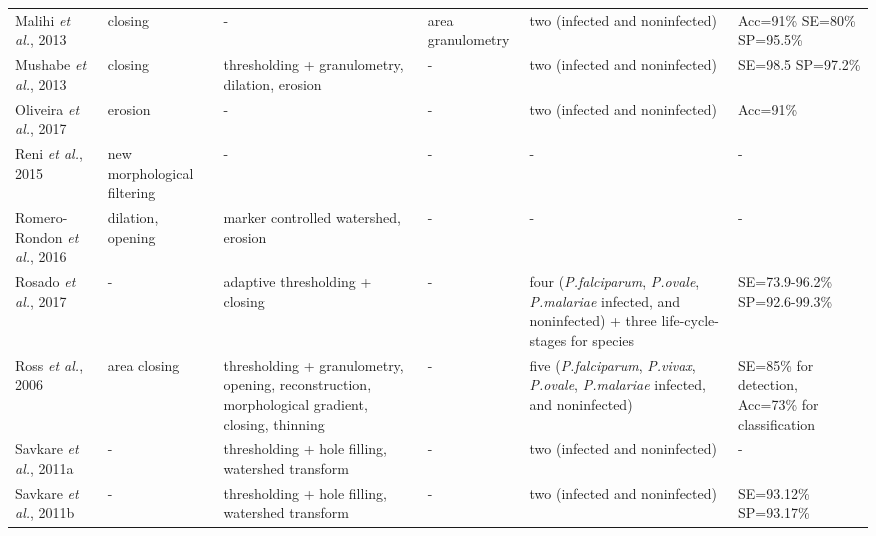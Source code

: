 \begin{longtable}{C{2.1cm} C{2.1cm} C{2.3cm} C{1.5cm} C{2.7cm} C{2.2cm} }
    Malihi \emph{et al.}, 2013  &
    	closing &
    	-  &
    	area granulometry &
    	two (infected and noninfected) &
    	Acc=91\% SE=80\% SP=95.5\% \vspace{0.6cm} \\	

    Mushabe \emph{et al.}, 2013  &
    	closing &
    	thresholding + granulometry, dilation, erosion  &
    	- &
    	two (infected and noninfected) &
    	SE=98.5 SP=97.2\% \vspace{0.6cm} \\	

    Oliveira \emph{et al.}, 2017  &
    	erosion &
    	-  &
    	- &
    	two (infected and noninfected) &
    	Acc=91\% \vspace{0.6cm} \\

    Reni \emph{et al.}, 2015  &
    	new morphological filtering &
    	-  &
    	- &
    	- &
    	- \vspace{0.6cm} \\

    Romero-Rondon \emph{et al.}, 2016  &
    	dilation, opening &
    	marker controlled watershed, erosion  &
    	- &
    	- &
    	- \vspace{0.6cm} \\

    Rosado \emph{et al.}, 2017  &
    	- &
    	adaptive thresholding + closing  &
    	- &
    	four (\emph{P.falciparum}, \emph{P.ovale}, \emph{P.malariae} infected, and noninfected) +
    three life-cycle-stages for species &
    	SE=73.9-96.2\% SP=92.6-99.3\% \vspace{0.6cm} \\

    Ross \emph{et al.}, 2006  &
    	area closing &
    	thresholding + granulometry, opening, reconstruction, morphological gradient, closing, thinning  &
        - &
    	five (\emph{P.falciparum}, \emph{P.vivax}, \emph{P.ovale}, \emph{P.malariae} infected, and noninfected) &
    	SE=85\% for detection, Acc=73\% for classification
    	 \vspace{0.6cm} \\


    Savkare \emph{et al.}, 2011a  &
    	- &
    	thresholding + hole filling, watershed transform  &
    	- &
    	two (infected and noninfected) &
    	- \vspace{0.6cm} \\

    Savkare \emph{et al.}, 2011b  &
    	- &
    	thresholding + hole filling, watershed transform  &
    	- &
    	two (infected and noninfected) &
    	SE=93.12\% SP=93.17\% \vspace{0.6cm} \\


\end{longtable}
